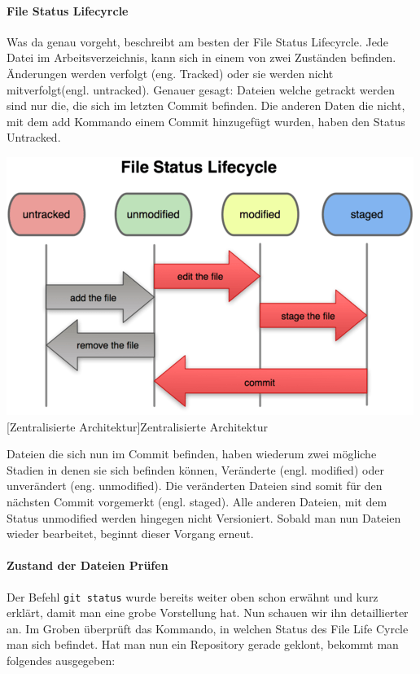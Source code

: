 \documentclass[12pt,a4paper,bibliography=totocnumbered,listof=totocnumbered]{scrartcl}
\begin{document}
\paragraph{File Status Lifecyrcle}
Was da genau vorgeht, beschreibt am besten der File Status Lifecyrcle. Jede Datei im Arbeitsverzeichnis, kann sich in einem von zwei Zuständen befinden. Änderungen werden verfolgt (eng. Tracked) oder sie werden nicht mitverfolgt(engl. untracked). 
Genauer gesagt: Dateien welche getrackt werden sind nur die, die sich im letzten Commit befinden. Die anderen Daten die nicht, mit dem add Kommando einem Commit hinzugefügt wurden, haben den Status Untracked. \newline


\newline
\newline
\vspace{1em}
\begin{minipage}{\linewidth}
	\centering
	\includegraphics[width=0.6\linewidth]{Bilder/flc.png}
	[Zentralisierte Architektur]{Zentralisierte Architektur\footnotemark }
	\label{fig:osgi}
\end{minipage} 	

Dateien die sich nun im Commit befinden, haben wiederum zwei mögliche Stadien in denen sie sich befinden können, Veränderte (engl. modified) oder unverändert (eng. unmodified). Die veränderten Dateien sind somit für den nächsten Commit vorgemerkt (engl. staged). Alle anderen Dateien, mit dem Status unmodified werden hingegen nicht Versioniert. Sobald man nun Dateien wieder bearbeitet, beginnt dieser Vorgang erneut.

\paragraph{Zustand der Dateien Prüfen}
Der Befehl \lstinline|git status| wurde bereits weiter oben schon erwähnt und kurz erklärt, damit man eine grobe Vorstellung hat. Nun schauen wir ihn detaillierter an. Im Groben überprüft das Kommando, in welchen Status des File Life Cyrcle man sich befindet. Hat man nun ein Repository gerade geklont, bekommt man folgendes ausgegeben:
\end{document}

